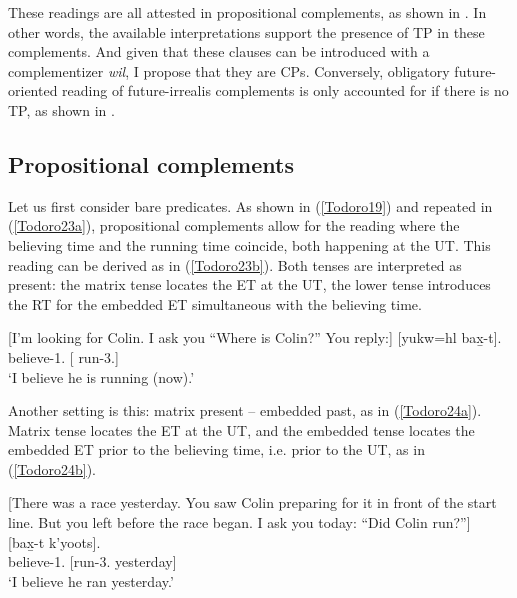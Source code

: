 \documentclass[output=paper]{langscibook}
\begin{document}
 These readings are all attested in propositional complements, as shown in . In other words, the available interpretations support the presence of TP
  in these complements. And given that these clauses can be introduced with a complementizer \emph{wil}, I propose that they are CPs. Conversely, obligatory future-oriented reading of future-irrealis complements is only accounted for if there is no TP, as shown in .\largerpage[-1]
 
 \subsection{Propositional complements}\label{Todoro:sect4.1}
 
 Let us first consider bare predicates. As shown in (\ref{Todoro19}) and repeated in (\ref{Todoro23a}), propositional complements allow for the reading where the believing time and the running time coincide, both happening at the UT. This reading can be derived as in (\ref{Todoro23b}). Both tenses are interpreted as present: the matrix tense locates the ET at the UT, the lower tense introduces the RT for the embedded ET simultaneous with the believing time. 

\begin{exe}
\ex \label{Todoro23}
\begin{xlist}

\ex \label{Todoro23a} [I’m looking for Colin. I ask you ``Where is Colin?'' You reply:]
 	[{yukw=hl}		{bax̱-t}]. \\
    believe-1{\sg}.{\seriesII}	[		run-3.{\seriesII}] \\
\glt ‘I believe he is running (now).’ 

\ex \label{Todoro23b}

\end{xlist}
\end{exe}\largerpage[-1]

Another setting is this: matrix present -- embedded past, as in (\ref{Todoro24a}). Matrix tense locates the ET at the UT, and the embedded tense locates the embedded ET prior to the believing time, i.e. prior to the UT, as in (\ref{Todoro24b}).

\begin{exe}
\ex \label{Todoro24}
\begin{xlist}

\ex \label{Todoro24a} [There was a race yesterday. You saw Colin preparing for it in       
     front of the start line. But you left before the race began. I ask you   
    today: ``Did Colin run?'']\\
 	[{bax̱-t} {k'yoots}]. \\
    believe-1{\sg}.{\seriesII}	[run-3.{\seriesII} yesterday] \\
\glt ‘I believe he ran yesterday.’ 

\ex \label{Todoro24b}

\end{xlist}
\end{exe}
\end{document}
